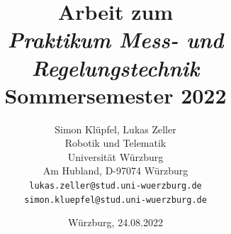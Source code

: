 \documentclass[11pt,a4paper]{article}
\begin{document}
\title{\Large\bf Arbeit zum \\ \textit{Praktikum Mess- und Regelungstechnik} \\ Sommersemester 2022}
\author{Simon Klüpfel, Lukas Zeller \\
  Robotik und Telematik \\
  Universität Würzburg\\
  Am Hubland, D-97074 Würzburg\\
\small \texttt{lukas.zeller@stud.uni-wuerzburg.de} \\
\small \texttt{simon.kluepfel@stud.uni-wuerzburg.de}}
\date{Würzburg, 24.08.2022}

\maketitle
\end{document}
